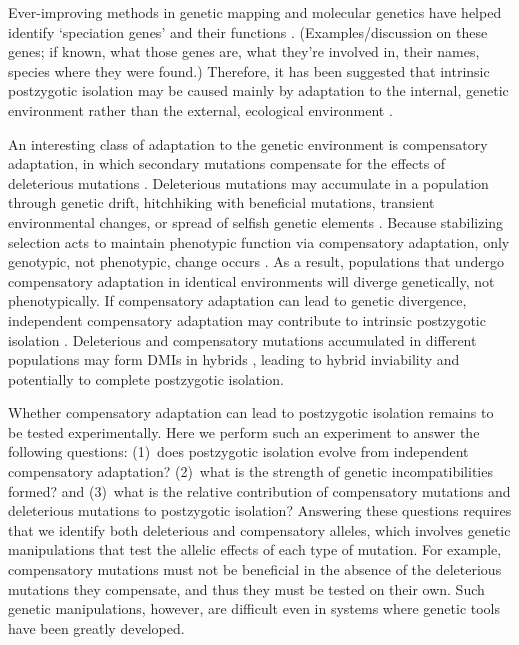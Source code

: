 \documentclass[12pt]{article}
\begin{document}
Ever-improving methods in genetic mapping and molecular genetics
have helped identify `speciation genes' and their functions
\cite{noo06,mah11}.
%
(Examples/discussion on these genes; if known, what those genes are,
what they're involved in, their names, species where they were found.)
%
Therefore, it has been suggested that intrinsic postzygotic isolation
may be caused mainly by adaptation to the internal, genetic environment
rather than the external, ecological environment \cite{pha09,pre10}.


An interesting class of adaptation to the genetic environment
is compensatory adaptation, in which secondary mutations
compensate for the effects of deleterious mutations
\cite{har96,bur99,moo00,lev00,mai02,est03,est11}.
%
Deleterious mutations may accumulate in a population
through genetic drift, hitchhiking with beneficial mutations,
transient environmental changes, or spread of selfish genetic elements
\cite{pre10}. %
%
Because stabilizing selection acts to maintain phenotypic function
via compensatory adaptation, only genotypic, not phenotypic, change occurs
\cite{har96}.
%
As a result, populations that undergo compensatory adaptation
in identical environments will diverge genetically, not phenotypically.
%
If compensatory adaptation can lead to genetic divergence,
independent compensatory adaptation may contribute to
intrinsic postzygotic isolation \cite{orr01,kon02,kul04,lan07,sch09b,pre10}.
%
Deleterious and compensatory mutations accumulated in different populations
may form DMIs in hybrids \cite{har96}, leading to hybrid inviability
and potentially to complete postzygotic isolation.



Whether compensatory adaptation can lead to postzygotic isolation
remains to be tested experimentally.
%
Here we perform such an experiment to answer the following questions:
(1)~does postzygotic isolation evolve from independent compensatory adaptation?
(2)~what is the strength of genetic incompatibilities formed?
and (3)~what is the relative contribution of compensatory mutations
and deleterious mutations to postzygotic isolation?
%
Answering these questions requires that we identify
both deleterious and compensatory alleles,
which involves genetic manipulations that test the allelic
effects of each type of mutation.
%
For example, compensatory mutations must not be beneficial
in the absence of the deleterious mutations they compensate,
and thus they must be tested on their own.
%
Such genetic manipulations, however, are difficult even in
systems where genetic tools have been greatly developed.
\end{document}
